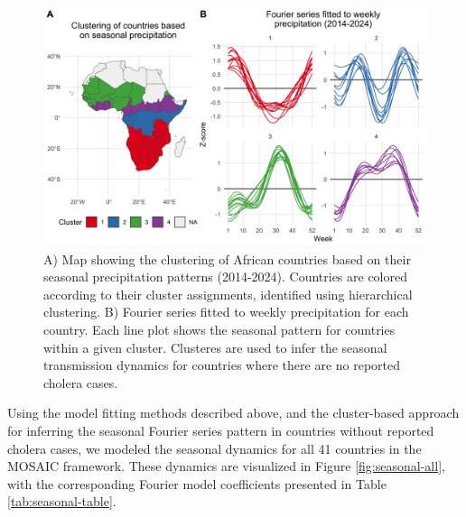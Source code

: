 \documentclass[
]{book}
\begin{document}
\begin{figure}

{\centering \includegraphics[width=1\linewidth]{figures/seasonal_precip_ward.D2_cluster} 

}

\caption{A) Map showing the clustering of African countries based on their seasonal precipitation patterns (2014-2024). Countries are colored according to their cluster assignments, identified using hierarchical clustering. B) Fourier series fitted to weekly precipitation for each country. Each line plot shows the seasonal pattern for countries within a given cluster. Clusteres are used to infer the seasonal transmission dynamics for countries where there are no reported cholera cases.}\label{fig:seasonal-cluster}
\end{figure}

Using the model fitting methods described above, and the cluster-based approach for inferring the seasonal Fourier series pattern in countries without reported cholera cases, we modeled the seasonal dynamics for all 41 countries in the MOSAIC framework. These dynamics are visualized in Figure \ref{fig:seasonal-all}, with the corresponding Fourier model coefficients presented in Table \ref{tab:seasonal-table}.
\end{document}
